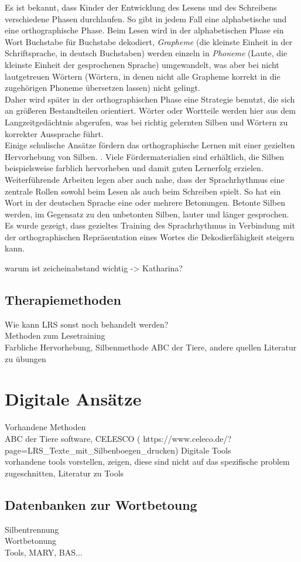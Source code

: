 Es ist bekannt, dass Kinder der Entwicklung des Lesens und des Schreibens verschiedene Phasen durchlaufen. So gibt in jedem Fall eine alphabetische und eine orthographische Phase. Beim Lesen wird in der alphabetischen Phase ein Wort Buchstabe für Buchstabe dekodiert, \textit{Grapheme} (die kleinste Einheit in der Schriftsprache, in deutsch Buchstaben) werden einzeln in \textit{Phoneme} (Laute, die kleinste Einheit der gesprochenen Sprache) umgewandelt, was aber bei nicht lautgetreuen Wörtern (Wörtern, in denen nicht alle Grapheme korrekt in die zugehörigen Phoneme übersetzen lassen) nicht gelingt.\\
Daher wird später in der orthographischen Phase eine Strategie benutzt, die sich an größeren Bestandteilen orientiert. Wörter oder Wortteile werden hier aus dem Langzeitgedächtnis abgerufen, was bei richtig gelernten Silben und Wörtern zu korrekter Aussprache führt. \cite{Steinbrink2014}\\
Einige schulische Ansätze fördern das orthographische Lernen mit einer gezielten Hervorhebung von Silben. .  Viele Fördermaterialien sind erhältlich, die Silben beispielsweise farblich hervorheben und damit guten Lernerfolg erzielen. 
Weiterführende Arbeiten legen aber auch nahe, dass der Sprachrhythmus eine zentrale Rollen sowohl beim Lesen als auch beim Schreiben spielt. So hat ein Wort in der deutschen Sprache eine oder mehrere Betonungen. Betonte Silben werden, im Gegensatz zu den unbetonten Silben, lauter und länger gesprochen. Es wurde gezeigt, dass gezieltes Training des Sprachrhythmus in Verbindung mit der orthographischen Repräsentation eines Wortes die Dekodierfähigkeit steigern kann. \cite{Brandelik2014}

warum ist zeicheinabstand wichtig -> Katharina?

\subsection{Therapiemethoden}

Wie kann LRS sonst noch behandelt werden?\\
Methoden zum Lesetraining\\
Farbliche Hervorhebung, Silbenmethode ABC der Tiere, andere quellen
Literatur zu übungen\\

\section{Digitale Ansätze}
Vorhandene Methoden\\
ABC der Tiere software, CELESCO ( https://www.celeco.de/?page=LRS\_Texte\_mit\_Silbenboegen\_drucken)
Digitale Tools\\

vorhandene tools vorstellen, zeigen, diese sind nicht auf das spezifische problem zugeschnitten, Literatur zu Tools\\

\subsection{Datenbanken zur Wortbetoung}
Silbentrennung\\
Wortbetonung\\
Tools, MARY, BAS...